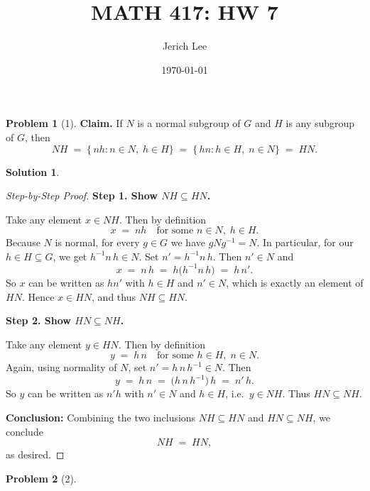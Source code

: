 \documentclass[12pt]{article}
\title{MATH 417: HW 7}
\author{Jerich Lee}
\date{\today}
\theoremstyle{definition} %
\newtheorem{solution}{Solution}
\newtheorem{problem}{Problem}
\theoremstyle{plain} %
\begin{document}
\maketitle
\begin{problem}[1]
    \textbf{Claim.} If $N$ is a normal subgroup of $G$ and $H$ is any subgroup of $G$, then
\[
  NH \;=\; \{\,nh : n\in N,\; h\in H\}\;=\;\{\,hn : h\in H,\; n\in N\}\;=\;HN.
\]
\end{problem}
\begin{solution}
    \noindent


\begin{proof}[Step-by-Step Proof]
\textbf{Step 1. Show $NH \subseteq HN$.}

\noindent
Take any element $x \in NH$. Then by definition
\[
  x \;=\; n h
  \quad\text{for some }n \in N,\; h \in H.
\]
Because $N$ is normal, for every $g \in G$ we have $gNg^{-1} = N$.  
In particular, for our $h \in H \subseteq G$, we get $h^{-1} n\,h \in N$.  
Set $n' = h^{-1} n\,h$.  Then $n' \in N$ and
\[
  x \;=\; n\,h 
        \;=\; h\bigl(h^{-1}n\,h\bigr)
        \;=\; h\,n'.
\]
So $x$ can be written as $h n'$ with $h \in H$ and $n' \in N$, which is exactly an element of $HN$.  
Hence $x \in HN$, and thus $NH \subseteq HN$.

\medskip

\textbf{Step 2. Show $HN \subseteq NH$.}

\noindent
Take any element $y \in HN$. Then by definition
\[
  y \;=\; h\,n
  \quad\text{for some }h \in H,\; n \in N.
\]
Again, using normality of $N$, set $n' = h\,n\,h^{-1} \in N$.  
Then
\[
  y \;=\; h\,n
        \;=\;\bigl(h\,n\,h^{-1}\bigr)\,h
        \;=\; n'\,h.
\]
So $y$ can be written as $n' h$ with $n' \in N$ and $h \in H$, i.e.\ $y \in NH$.  
Thus $HN \subseteq NH$.

\medskip

\textbf{Conclusion:} Combining the two inclusions $NH \subseteq HN$ and $HN \subseteq NH$, we conclude
\[
NH \;=\; HN,
\]
as desired.
\end{proof}
\end{solution}
\begin{problem}[2]

\end{problem}
\end{document}

